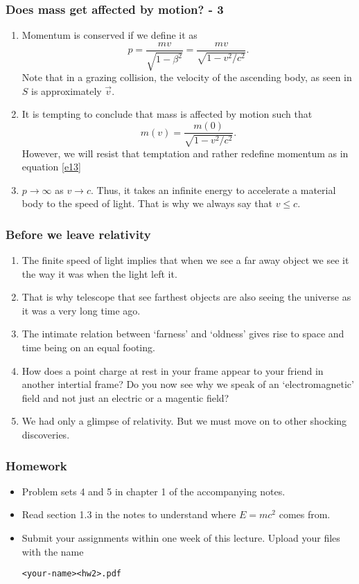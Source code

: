 \documentclass{beamer}
\begin{document}
\begin{frame}
\frametitle{Does mass get affected by motion? - 3}
\begin{enumerate}
\item Momentum is conserved if we define it as
\begin{equation}\label{e13}
p = \frac{mv}{\sqrt{1 - \beta^2}} = \frac{mv}{\sqrt{1 - v^2/c^2}} .
\end{equation}
Note that in a grazing collision, the velocity of the ascending body, as seen
in $S$ is approximately $\vec{v}$.
\item It is tempting to conclude that mass is affected by motion such that
\begin{equation}\label{e14}
m(v) = \frac{m(0)}{\sqrt{1 - v^2/c^2}}.
\end{equation}
However, we will resist that temptation and rather redefine momentum as in
equation \eqref{e13}
\item $p \rightarrow \infty$ as $v \rightarrow c$. Thus, it takes an infinite
energy to accelerate a material body to the speed of light. That is why we
always say that $v \le c$. 
\end{enumerate}
\end{frame}

\begin{frame}
\frametitle{Before we leave relativity}
\begin{enumerate}
\item The finite speed of light implies that when we see a far away object we 
see it the way it was when the light left it. 
\item That is why telescope that see farthest objects are also seeing the 
universe as it was a very long time ago.
\item The intimate relation between `farness' and `oldness' gives rise to 
space and time being on an equal footing.
\item How does a point charge at rest in your frame appear to your friend
in another intertial frame? Do you now see why we speak of an `electromagnetic'
field and not just an electric or a magentic field?
\item We had only a glimpse of relativity. But we must move on to other 
shocking discoveries.
\end{enumerate}
\end{frame}

\begin{frame}[fragile]
\frametitle{Homework}
\begin{itemize}
\item Problem sets 4 and 5 in chapter 1 of the accompanying notes.
\item Read section 1.3 in the notes to understand where $E = mc^2$ comes from.
\item Submit your assignments within one week of this lecture. Upload your 
files with the name \begin{verbatim}<your-name><hw2>.pdf\end{verbatim}
\end{itemize}
\end{frame}
\end{document}
